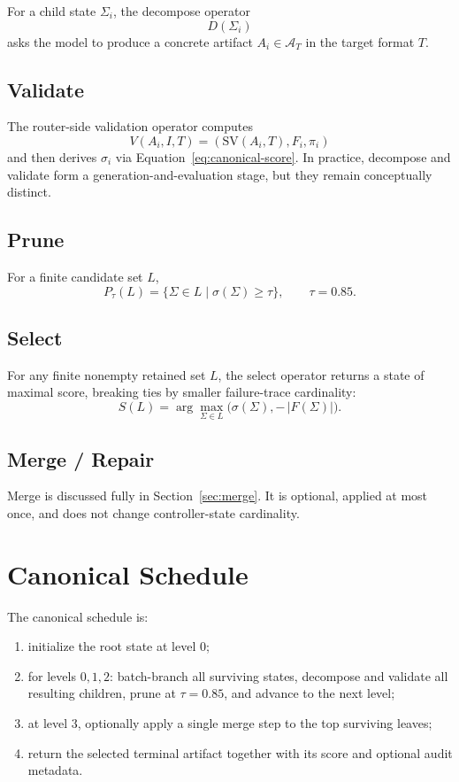 \documentclass[11pt,a4paper]{article}
\numberwithin{equation}{section}
\theoremstyle{definition}
\newcommand{\SV}{\mathrm{SV}}
\newcommand{\States}{\Sigma}
\newcommand{\Artifacts}{\mathcal{A}}
\begin{document}
For a child state \(\States_i\), the decompose operator
\[
D(\States_i)
\]
asks the model to produce a concrete artifact \(A_i\in \Artifacts_T\) in the target format \(T\).

\subsection{Validate}

The router-side validation operator computes
\[
V(A_i,I,T)=(\SV(A_i,T),F_i,\pi_i)
\]
and then derives \(\sigma_i\) via Equation~\eqref{eq:canonical-score}. In practice, decompose and validate form a generation-and-evaluation stage, but they remain conceptually distinct.

\subsection{Prune}

For a finite candidate set \(L\),
\[
P_\tau(L)=\{\States\in L\mid \sigma(\States)\ge \tau\},
\qquad \tau=0.85.
\]

\subsection{Select}

For any finite nonempty retained set \(L\), the select operator returns a state of maximal score, breaking ties by smaller failure-trace cardinality:
\[
S(L)=\arg\max_{\States\in L}\bigl(\sigma(\States),-\,|F(\States)|\bigr).
\]

\subsection{Merge / Repair}

Merge is discussed fully in Section~\ref{sec:merge}. It is optional, applied at most once, and does not change controller-state cardinality.

\section{Canonical Schedule}

The canonical schedule is:
\begin{enumerate}[leftmargin=2.25em]
    \item initialize the root state at level \(0\);
    \item for levels \(0,1,2\): batch-branch all surviving states, decompose and validate all resulting children, prune at \(\tau=0.85\), and advance to the next level;
    \item at level \(3\), optionally apply a single merge step to the top surviving leaves;
    \item return the selected terminal artifact together with its score and optional audit metadata.
\end{enumerate}
\end{document}
